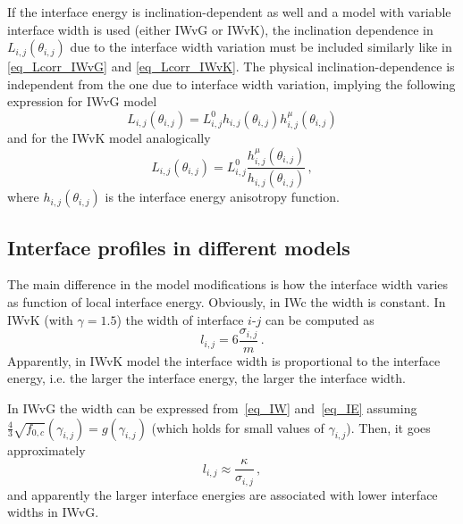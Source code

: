 If the interface energy is inclination-dependent as well and a model with variable interface width is used (either IWvG or IWvK), the inclination dependence in $L_{i,j}(\theta_{i,j})$ due to the interface width variation must be included similarly like in \eqref{eq_Lcorr_IWvG} and \eqref{eq_Lcorr_IWvK}. The physical inclination-dependence is independent from the one due to interface width variation, implying the following expression for IWvG model
\begin{equation}     
	L_{i,j}(\theta_{i,j}) = L_{i,j}^0h_{i,j}(\theta_{i,j})h_{i,j}^\mu(\theta_{i,j})
\end{equation}
and for the IWvK model analogically
\begin{equation}
	L_{i,j}(\theta_{i,j}) = L_{i,j}^0\frac{h_{i,j}^\mu(\theta_{i,j})}{h_{i,j}(\theta_{i,j})} \,,
\end{equation}
where $h_{i,j}(\theta_{i,j})$ is the interface energy anisotropy function.

\subsection{Interface profiles in different models} \label{sec_difference_in_profiles}
The main difference in the model modifications is how the interface width varies as function of local interface energy. Obviously, in IWc the width is constant. In IWvK (with $\gamma=1.5$) the width of interface $i$-$j$ can be computed as
\begin{equation}
	l_{i,j} = 6\frac{\sigma_{i,j}}{m} \,.
\end{equation}
Apparently, in IWvK model the interface width is proportional to the interface energy, i.e. the larger the interface energy, the larger the interface width.

In IWvG the width can be expressed from~\eqref{eq_IW} and~\eqref{eq_IE} assuming $\frac{4}{3}\sqrt{f_{0,c}}(\gamma_{i,j})=g(\gamma_{i,j})$ (which holds for small values of $\gamma_{i,j}$). Then, it goes approximately
\begin{equation}
	l_{i,j} \approx \frac{\kappa}{\sigma_{i,j}} \,,
\end{equation}
and apparently the larger interface energies are associated with lower interface widths in IWvG. 


